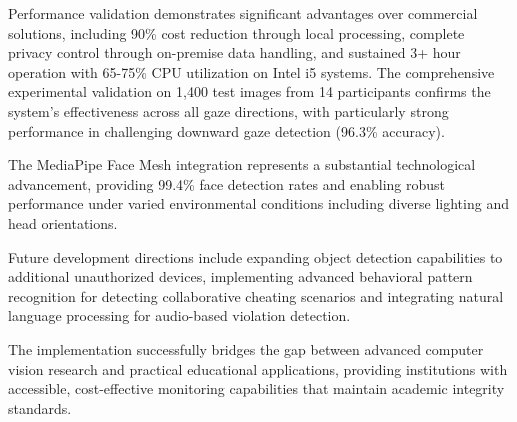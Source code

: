 \documentclass[conference]{IEEEtran}
\begin{document}
Performance validation demonstrates significant advantages over commercial solutions, 
including 90\% cost reduction through local processing, complete privacy control 
through on-premise data handling, and sustained 3+ hour operation with 65-75\% CPU 
utilization on Intel i5 systems. The comprehensive experimental validation on 1,400 
test images from 14 participants confirms the system's effectiveness across all gaze 
directions, with particularly strong performance in challenging downward gaze detection 
(96.3\% accuracy).

The MediaPipe Face Mesh integration represents a substantial technological advancement, 
providing 99.4\% face detection rates and enabling robust performance under varied 
environmental conditions including diverse lighting and head orientations.

Future development directions include expanding object detection capabilities to 
additional unauthorized devices, implementing advanced behavioral pattern recognition 
for detecting collaborative cheating scenarios and integrating natural language 
processing for audio-based violation detection.

The implementation successfully bridges the gap between advanced computer vision research 
and practical educational applications, providing institutions with accessible, 
cost-effective monitoring capabilities that maintain academic integrity standards.
\end{document}
